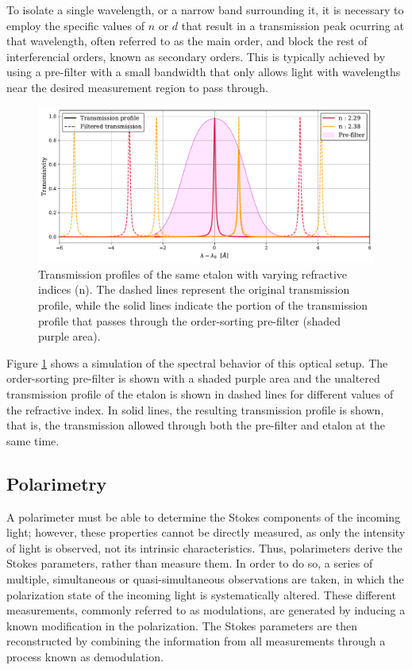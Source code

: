 To isolate a single wavelength, or a narrow band surrounding it, it is necessary to employ the specific values of $n$ or $d$ that result in a transmission peak ocurring at that wavelength, often referred to as the main order, and block the rest of interferencial orders, known as secondary orders. This is typically achieved by using a pre-filter with a small bandwidth that only allows light with wavelengths near the desired measurement region to pass through. 

\begin{figure}
  \centering
  \includegraphics[width = \textwidth]{figures/Introduction_to_spectropolarimeters/Etalon_and_prefilter_example.pdf}
  \caption[Etalon's transmission profiles and prefilter.]{Transmission profiles of the same etalon with varying refractive indices (n). The dashed lines represent the original transmission profile, while the solid lines indicate the portion of the transmission profile that passes through the order-sorting pre-filter (shaded purple area).} 
  \label{fig_ch2: etalon_example}
\end{figure}

Figure \ref{fig_ch2: etalon_example} shows a simulation of the spectral behavior of this optical setup. The order-sorting pre-filter is shown with a shaded purple area and the unaltered transmission profile of the etalon is shown in dashed lines for different values of the refractive index. In solid lines, the resulting transmission profile is shown, that is, the transmission allowed through both the pre-filter and etalon at the same time. 

\subsection{Polarimetry}

A polarimeter must be able to determine the Stokes components of the incoming light; however, these properties cannot be directly measured, as only the intensity of light is observed, not its intrinsic characteristics. Thus, polarimeters derive the Stokes parameters, rather than measure them. In order to do so, a series of multiple, simultaneous or quasi-simultaneous observations are taken, in which the polarization state of the incoming light is systematically altered. These different measurements, commonly referred to as modulations, are generated by inducing a known modification in the polarization. The Stokes parameters are then reconstructed by combining the information from all measurements through a process known as demodulation.

